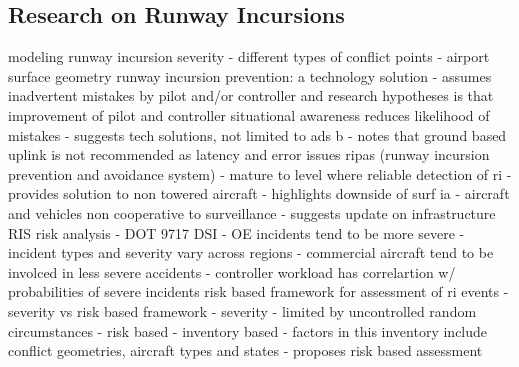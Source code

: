 \subsection{Research on Runway Incursions}

modeling runway incursion severity
- different types of conflict points
- airport surface geometry
\newline
runway incursion prevention: a technology solution \newline
- assumes inadvertent mistakes by pilot and/or controller and research hypotheses is that improvement of pilot and controller situational awareness reduces likelihood of mistakes \newline
- suggests tech solutions, not limited to ads b \newline
- notes that ground based uplink is not recommended as latency and error issues \newline
\newline
ripas (runway incursion prevention and avoidance system) \newline
- mature to level where reliable detection of ri \newline
- provides solution to non towered aircraft \newline
- highlights downside of surf ia - aircraft and vehicles non cooperative to surveillance \newline
- suggests update on infrastructure \newline
\newline 
RIS risk analysis - DOT 9717 DSI \newline
- OE incidents tend to be more severe \newline
- incident types and severity vary across regions \newline
- commercial aircraft tend to be involced in less severe accidents \newline
- controller workload has correlartion w/ probabilities of severe incidents \newline
\newline
risk based framework for assessment of ri events \newline
- severity vs risk based framework \newline
- severity - limited by uncontrolled random circumstances \newline
- risk based - inventory based \newline
- factors in this inventory include conflict geometries, aircraft types and states \newline
- proposes risk based assessment \newline




